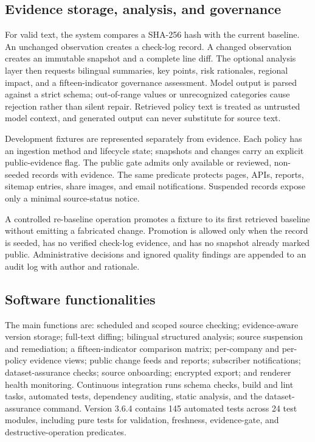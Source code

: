 \documentclass[preprint,12pt,a4paper]{elsarticle}
\begin{document}
\subsection{Evidence storage, analysis, and governance}

For valid text, the system compares a SHA-256 hash with the current baseline. An
unchanged observation creates a check-log record. A changed observation creates
an immutable snapshot and a complete line diff. The optional analysis layer then
requests bilingual summaries, key points, risk rationales, regional impact, and
a fifteen-indicator governance assessment. Model output is parsed against a
strict schema; out-of-range values or unrecognized categories cause rejection
rather than silent repair. Retrieved policy text is treated as untrusted model
context, and generated output can never substitute for source text.

Development fixtures are represented separately from evidence. Each policy has
an ingestion method and lifecycle state; snapshots and changes carry an explicit
public-evidence flag. The public gate admits only available or reviewed,
non-seeded records with evidence. The same predicate protects pages, APIs,
reports, sitemap entries, share images, and email notifications. Suspended
records expose only a minimal source-status notice.

A controlled re-baseline operation promotes a fixture to its first retrieved
baseline without emitting a fabricated change. Promotion is allowed only when
the record is seeded, has no verified check-log evidence, and has no snapshot
already marked public. Administrative decisions and ignored quality findings
are appended to an audit log with author and rationale.

\subsection{Software functionalities}

The main functions are: scheduled and scoped source checking; evidence-aware
version storage; full-text diffing; bilingual structured analysis; source
suspension and remediation; a fifteen-indicator comparison matrix; per-company
and per-policy evidence views; public change feeds and reports; subscriber
notifications; dataset-assurance checks; source onboarding; encrypted export;
and renderer health monitoring. Continuous integration runs schema checks,
build and lint tasks, automated tests, dependency auditing, static analysis, and
the dataset-assurance command. Version 3.6.4 contains 145 automated tests across
24 test modules, including pure tests for validation, freshness, evidence-gate,
and destructive-operation predicates.
\end{document}
